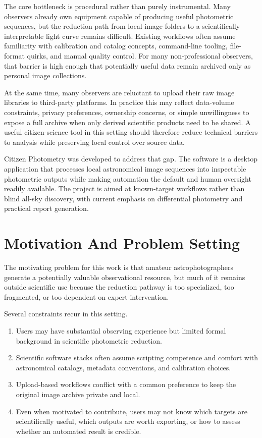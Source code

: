 \documentclass[modern]{aastex701}
\begin{document}
The core bottleneck is procedural rather than purely instrumental. Many observers already own equipment capable of producing useful photometric sequences, but the reduction path from local image folders to a scientifically interpretable light curve remains difficult. Existing workflows often assume familiarity with calibration and catalog concepts, command-line tooling, file-format quirks, and manual quality control. For many non-professional observers, that barrier is high enough that potentially useful data remain archived only as personal image collections.

At the same time, many observers are reluctant to upload their raw image libraries to third-party platforms. In practice this may reflect data-volume constraints, privacy preferences, ownership concerns, or simple unwillingness to expose a full archive when only derived scientific products need to be shared. A useful citizen-science tool in this setting should therefore reduce technical barriers to analysis while preserving local control over source data.

Citizen Photometry was developed to address that gap. The software is a desktop application that processes local astronomical image sequences into inspectable photometric outputs while making automation the default and human oversight readily available. The project is aimed at known-target workflows rather than blind all-sky discovery, with current emphasis on differential photometry and practical report generation.

\section{Motivation And Problem Setting}\label{sec:motivation}

The motivating problem for this work is that amateur astrophotographers generate a potentially valuable observational resource, but much of it remains outside scientific use because the reduction pathway is too specialized, too fragmented, or too dependent on expert intervention.

Several constraints recur in this setting.

\begin{enumerate}
\item Users may have substantial observing experience but limited formal background in scientific photometric reduction.
\item Scientific software stacks often assume scripting competence and comfort with astronomical catalogs, metadata conventions, and calibration choices.
\item Upload-based workflows conflict with a common preference to keep the original image archive private and local.
\item Even when motivated to contribute, users may not know which targets are scientifically useful, which outputs are worth exporting, or how to assess whether an automated result is credible.
\end{enumerate}
\end{document}
